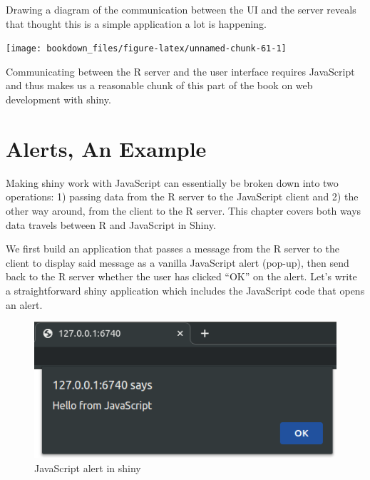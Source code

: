 \documentclass[
]{krantz}
\makeatletter
\newenvironment{Shaded}{\begin{snugshade}}{\end{snugshade}}
\newcommand{\ControlFlowTok}[1]{\textcolor[rgb]{0.27,0.27,0.27}{\textbf{#1}}}
\newcommand{\KeywordTok}[1]{\textcolor[rgb]{0.27,0.27,0.27}{\textbf{#1}}}
\newcommand{\NormalTok}[1]{#1}
\newcommand{\OperatorTok}[1]{\textcolor[rgb]{0.43,0.43,0.43}{\textbf{#1}}}
\newcommand{\StringTok}[1]{\textcolor[rgb]{0.5,0.5,0.5}{#1}}
\newenvironment{kframe}{%
\medskip{}
\setlength{\fboxsep}{.8em}
 \def\at@end@of@kframe{}%
 \ifinner\ifhmode%
  \def\at@end@of@kframe{\end{minipage}}%
  \begin{minipage}{\columnwidth}%
 \fi\fi%
 \def\FrameCommand##1{\hskip\@totalleftmargin \hskip-\fboxsep
 \colorbox{shadecolor}{##1}\hskip-\fboxsep
     \hskip-\linewidth \hskip-\@totalleftmargin \hskip\columnwidth}%
 \MakeFramed {\advance\hsize-\width
   \@totalleftmargin\z@ \linewidth\hsize
   \@setminipage}}%
 {\par\unskip\endMakeFramed%
 \at@end@of@kframe}
\renewenvironment{Shaded}{\begin{kframe}}{\end{kframe}}
\makeatother
\begin{document}
Drawing a diagram of the communication between the UI and the server reveals that thought this is a simple application a lot is happening.

\begin{center}\texttt{[image: bookdown\_files/figure-latex/unnamed-chunk-61-1]} \end{center}

Communicating between the R server and the user interface requires JavaScript and thus makes us a reasonable chunk of this part of the book on web development with shiny.

\hypertarget{shiny-intro-example}{%
\section{Alerts, An Example}\label{shiny-intro-example}}

Making shiny work with JavaScript can essentially be broken down into two operations: 1) passing data from the R server to the JavaScript client and 2) the other way around, from the client to the R server. This chapter covers both ways data travels between R and JavaScript in Shiny.

We first build an application that passes a message from the R server to the client to display said message as a vanilla JavaScript alert (pop-up), then send back to the R server whether the user has clicked ``OK'' on the alert. Let's write a straightforward shiny application which includes the JavaScript code that opens an alert.

\begin{Shaded}
\end{Shaded}

\begin{figure}
\centering
\includegraphics{images/alert.png}
\caption{JavaScript alert in shiny}
\end{figure}
\end{document}
